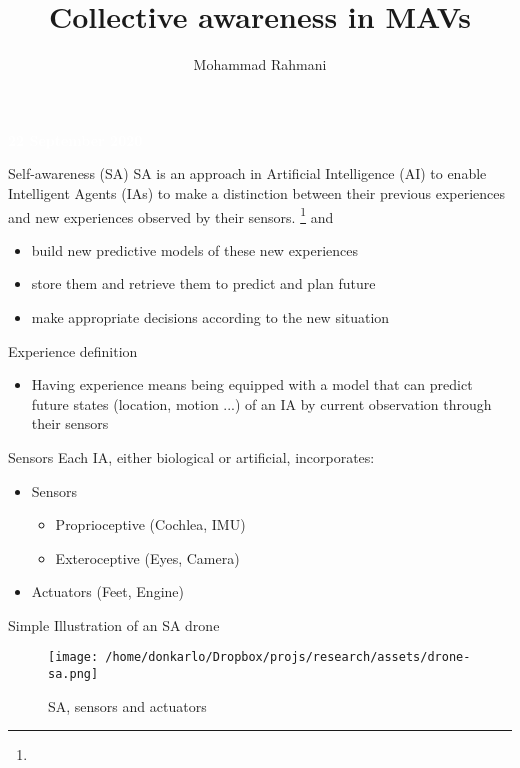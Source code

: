 \documentclass[unknownkeysallowed]{beamer}
\title{Collective awareness in MAVs}
\author{Mohammad Rahmani}
\institute{Pervasive Computing Group (Klagenfurt university)}
\begin{document}
	\begin{frame}
		\date{}
		\maketitle
		\textcolor{white}{\textbf{22 September 2020}}
	\end{frame}
	
	\begin{frame}{Self-awareness (SA)}
		SA is an approach in Artificial Intelligence (AI) to enable Intelligent Agents (IAs) to make a distinction between their previous experiences and new experiences observed by their sensors. \footnote{} and
		\begin{itemize}
			\item build new predictive models of these new experiences 
			\item store them and retrieve them to predict and plan future
			\item make appropriate decisions according to the new situation
		\end{itemize}
	\end{frame}

	\begin{frame}{Experience definition}
		\begin{itemize}
			\item Having experience means being equipped with a model that can predict future states (location, motion ...) of an IA by current observation through their sensors 
		\end{itemize}
	\end{frame}

	\begin{frame}{Sensors}
		Each IA, either biological or artificial, incorporates:
		\begin{itemize}
			\item Sensors
			\begin{itemize}
				\item Proprioceptive (Cochlea, IMU)
				\item Exteroceptive (Eyes, Camera)
			\end{itemize}
			\item Actuators (Feet, Engine)
		\end{itemize}
	\end{frame}

	\begin{frame}{Simple Illustration of an SA drone}
		\begin{figure}
			\texttt{[image: /home/donkarlo/Dropbox/projs/research/assets/drone-sa.png]}
			\caption{SA, sensors and actuators}
		\end{figure}
	\end{frame}
\end{document}
